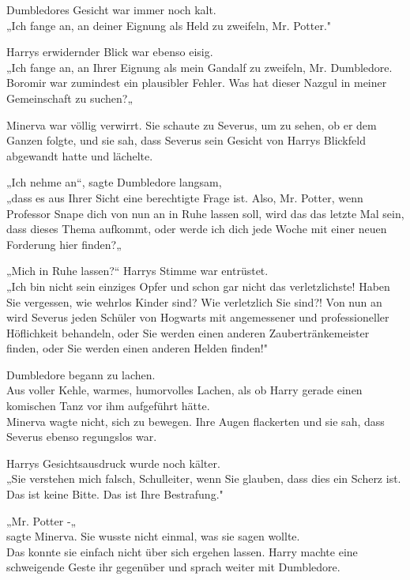 {Dumbledores Gesicht war immer noch kalt.\\ „Ich fange an, an deiner Eignung als Held zu zweifeln, Mr. Potter."

Harrys erwidernder Blick war ebenso eisig.\\ „Ich fange an, an Ihrer Eignung als mein Gandalf zu zweifeln, Mr. Dumbledore. Boromir war zumindest ein plausibler Fehler. Was hat dieser Nazgul in meiner Gemeinschaft zu suchen?„

Minerva war völlig verwirrt. Sie schaute zu Severus, um zu sehen, ob er dem Ganzen folgte, und sie sah, dass Severus sein Gesicht von Harrys Blickfeld abgewandt hatte und lächelte.

„Ich nehme an“, sagte Dumbledore langsam,\\ „dass es aus Ihrer Sicht eine berechtigte Frage ist. Also, Mr. Potter, wenn Professor Snape dich von nun an in Ruhe lassen soll, wird das das letzte Mal sein, dass dieses Thema aufkommt, oder werde ich dich jede Woche mit einer neuen Forderung hier finden?„

„Mich in Ruhe lassen?“ Harrys Stimme war entrüstet.\\ „Ich bin nicht sein einziges Opfer und schon gar nicht das verletzlichste! Haben Sie vergessen, wie wehrlos Kinder sind? Wie verletzlich Sie sind?! Von nun an wird Severus jeden Schüler von Hogwarts mit angemessener und professioneller Höflichkeit behandeln, oder Sie werden einen anderen Zaubertränkemeister finden, oder Sie werden einen anderen Helden finden!"

Dumbledore begann zu lachen.\\ Aus voller Kehle, warmes, humorvolles Lachen, als ob Harry gerade einen komischen Tanz vor ihm aufgeführt hätte.\\ Minerva wagte nicht, sich zu bewegen. Ihre Augen flackerten und sie sah, dass Severus ebenso regungslos war.

Harrys Gesichtsausdruck wurde noch kälter.\\ „Sie verstehen mich falsch, Schulleiter, wenn Sie glauben, dass dies ein Scherz ist.\\ Das ist keine Bitte. Das ist Ihre Bestrafung."

„Mr. Potter -„\\ sagte Minerva. Sie wusste nicht einmal, was sie sagen wollte.\\ Das konnte sie einfach nicht über sich ergehen lassen. Harry machte eine schweigende Geste ihr gegenüber und sprach weiter mit Dumbledore.

}
